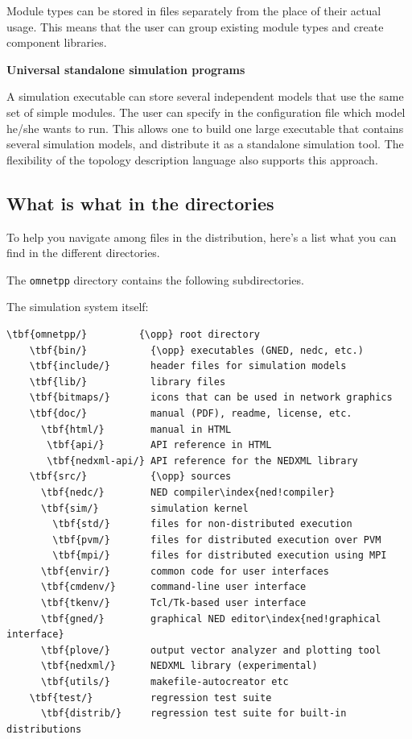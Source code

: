 Module types can be stored in files separately from the place
of their actual usage. This means that the user can group existing
module types and create component libraries.


\textbf{Universal standalone simulation programs}


A simulation executable can store several independent models
that use the same set of simple modules. The user can specify
in the configuration file which model he/she wants to run. This
allows one to build one large executable that contains several
simulation models, and distribute it as a standalone simulation
tool. The flexibility of the topology description language also
supports this approach.


\subsection{What is what in the directories}

To help you navigate among files in the {\opp} distribution,
here's a list what you can find in the different directories.

The \texttt{omnetpp} directory contains the following subdirectories.

The simulation system itself:

\begin{Verbatim}[commandchars=\\\{\}]
  \tbf{omnetpp/}         {\opp} root directory
    \tbf{bin/}           {\opp} executables (GNED, nedc, etc.)
    \tbf{include/}       header files for simulation models
    \tbf{lib/}           library files
    \tbf{bitmaps/}       icons that can be used in network graphics
    \tbf{doc/}           manual (PDF), readme, license, etc.
      \tbf{html/}        manual in HTML
       \tbf{api/}        API reference in HTML
       \tbf{nedxml-api/} API reference for the NEDXML library
    \tbf{src/}           {\opp} sources
      \tbf{nedc/}        NED compiler\index{ned!compiler}
      \tbf{sim/}         simulation kernel
        \tbf{std/}       files for non-distributed execution
        \tbf{pvm/}       files for distributed execution over PVM
        \tbf{mpi/}       files for distributed execution using MPI
      \tbf{envir/}       common code for user interfaces
      \tbf{cmdenv/}      command-line user interface
      \tbf{tkenv/}       Tcl/Tk-based user interface
      \tbf{gned/}        graphical NED editor\index{ned!graphical interface}
      \tbf{plove/}       output vector analyzer and plotting tool
      \tbf{nedxml/}      NEDXML library (experimental)
      \tbf{utils/}       makefile-autocreator etc
    \tbf{test/}          regression test suite
      \tbf{distrib/}     regression test suite for built-in distributions
\end{Verbatim}

